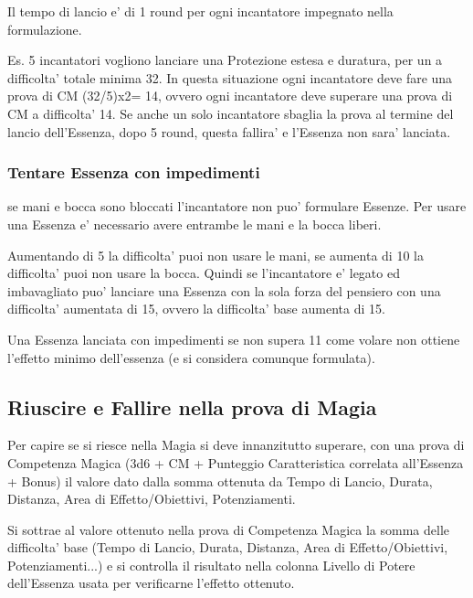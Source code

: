 \documentclass[a4paper,11pt,twoside,openany]{book}
\begin{document}
Il tempo di lancio e' di 1 round per ogni incantatore impegnato nella formulazione.

Es. 5 incantatori vogliono lanciare una Protezione estesa e duratura, per un a difficolta' totale minima 32. In questa situazione ogni incantatore deve fare una prova di CM (32/5)x2= 14, ovvero ogni incantatore deve superare una prova di CM a difficolta' 14. Se anche un solo incantatore sbaglia la prova al termine del lancio dell'Essenza, dopo 5 round, questa fallira' e l'Essenza non sara' lanciata.

\subsubsection{Tentare Essenza con impedimenti}

se mani e bocca sono bloccati l'incantatore non puo' formulare Essenze. Per usare una Essenza e' necessario avere entrambe le mani e la bocca liberi.

Aumentando di 5 la difficolta' puoi non usare le mani, se aumenta di 10 la difficolta' puoi non usare la bocca. Quindi se l'incantatore e' legato ed imbavagliato puo' lanciare una Essenza con la sola forza del pensiero con una difficolta' aumentata di 15, ovvero la difficolta' base aumenta di 15.

Una Essenza lanciata con impedimenti se non supera 11 come volare non ottiene l'effetto minimo dell'essenza (e si considera comunque formulata).

\subsection{Riuscire e Fallire nella prova di Magia}

\label{riuscire-e-fallire-nella-prova-di-magia}

Per capire se si riesce nella Magia si deve innanzitutto superare, con una prova di Competenza Magica (3d6 + CM + Punteggio Caratteristica correlata all'Essenza + Bonus) il valore dato dalla somma ottenuta da Tempo di Lancio, Durata, Distanza, Area di Effetto/Obiettivi, Potenziamenti.

Si sottrae al valore ottenuto nella prova di Competenza Magica la somma delle difficolta' base (Tempo di Lancio, Durata, Distanza, Area di Effetto/Obiettivi, Potenziamenti...) e si controlla il risultato nella colonna Livello di Potere dell'Essenza usata per verificarne l'effetto ottenuto.
\end{document}
